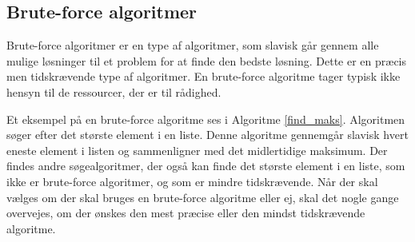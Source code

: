 \subsection{Brute-force algoritmer}
Brute-force algoritmer er en type af algoritmer, som slavisk går gennem alle mulige løsninger til et problem for at finde den bedste løsning.
Dette er en præcis men tidskrævende type af algoritmer. 
En brute-force algoritme tager typisk ikke hensyn til de ressourcer, der er til rådighed.

Et eksempel på en brute-force algoritme ses i Algoritme \ref{find_maks}. Algoritmen søger efter det største element i en liste. 
Denne algoritme gennemgår slavisk hvert eneste element i listen og sammenligner med det midlertidige maksimum.
Der findes andre søgealgoritmer, der også kan finde det største element i en liste, som ikke er brute-force algoritmer, og som er mindre tidskrævende. 
Når der skal vælges om der skal bruges en brute-force algoritme eller ej, skal det nogle gange overvejes, om der ønskes den mest præcise eller den mindst tidskrævende algoritme. 
